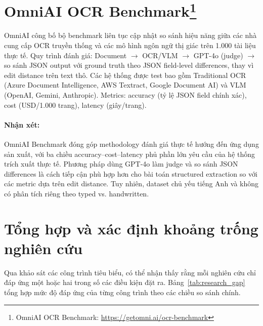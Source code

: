 ﻿\documentclass[12pt]{report}
\begin{document}
\section[OmniAI OCR Benchmark]{OmniAI OCR Benchmark\protect\footnote{OmniAI OCR Benchmark: \url{https://getomni.ai/ocr-benchmark}}}\label{sec:rw_omniai}

OmniAI công bố bộ benchmark liên tục cập nhật so sánh hiệu năng giữa các nhà cung cấp OCR truyền thống và các mô hình ngôn ngữ thị giác trên 1.000 tài liệu thực tế. Quy trình đánh giá: Document $\rightarrow$ OCR/VLM $\rightarrow$ GPT-4o (judge) $\rightarrow$ so sánh JSON output với ground truth theo JSON field-level differences, thay vì edit distance trên text thô. Các hệ thống được test bao gồm Traditional OCR (Azure Document Intelligence, AWS Textract, Google Document AI) và VLM (OpenAI, Gemini, Anthropic). Metrics: accuracy (tỷ lệ JSON field chính xác), cost (USD/1.000 trang), latency (giây/trang).

\paragraph{Nhận xét:}
OmniAI Benchmark đóng góp methodology đánh giá thực tế hướng đến ứng dụng sản xuất, với ba chiều accuracy--cost--latency phủ phần lớn yêu cầu của hệ thống trích xuất thực tế. Phương pháp dùng GPT-4o làm judge và so sánh JSON differences là cách tiếp cận phù hợp hơn cho bài toán structured extraction so với các metric dựa trên edit distance. Tuy nhiên, dataset chủ yếu tiếng Anh và không có phân tích riêng theo typed vs. handwritten.

\section{Tổng hợp và xác định khoảng trống nghiên cứu}\label{sec:research_gap}

Qua khảo sát các công trình tiêu biểu, có thể nhận thấy rằng mỗi nghiên cứu chỉ đáp ứng một hoặc hai trong số các điều kiện đặt ra. Bảng~\ref{tab:research_gap} tổng hợp mức độ đáp ứng của từng công trình theo các chiều so sánh chính.
\end{document}
